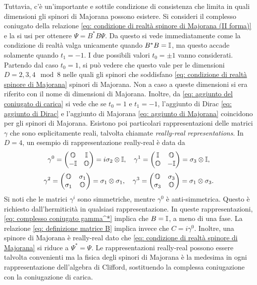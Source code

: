 Tuttavia, c'è un'importante e sottile condizione di consistenza che limita in quali dimensioni gli spinori di Majorana possono esistere. Si consideri il complesso coniugato della relazione \eqref{eq: condizione di realtà spinore di Majorana (II forma)} e la si usi per ottenere $\Psi = B^*B\Psi$. Da questo si vede immediatamente come la condizione di realtà valga unicamente quando $B^*B = \mathbb{I}$, ma questo accade solamente quando $t_1 = -1$. I due possibili valori $t_0 = \pm1$ vanno considerati. Partendo dal caso $t_0 = 1$, si può vedere che questo vale per le dimensioni $D = 2,3,4\mod{8}$ nelle quali gli spinori che soddisfano \eqref{eq: condizione di realtà spinore di Majorana} spinori di Majorana. Non a caso a queste dimensioni si era riferito con il nome di dimensioni di Majorana. Inoltre, da \eqref{eq: aggiunto del coniugato di carica} si vede che se $t_0 = 1$ e $t_1 = -1$, l'aggiunto di Dirac \eqref{eq: aggiunto di Dirac} e l'aggiunto di Majorana \eqref{eq: aggiunto di Majorana} coincidono per gli spinori di Majorana. Esistono poi particolari rappresentazioni delle matrici $\gamma$ che sono esplicitamente reali, talvolta chiamate \emph{really-real representations}. In $D = 4$, un esempio di rappresentazione really-real è data da
\begin{equation}
    \gamma^0 = 
    \begin{pmatrix}
        \mathbb{O} & \mathbb{I} \\
        -\mathbb{I} & \mathbb{O}
    \end{pmatrix} = i\sigma_2 \otimes \mathbb{I},\quad \gamma^1 = 
    \begin{pmatrix}
        \mathbb{I} & \mathbb{O} \\
        \mathbb{O} & -\mathbb{I}
    \end{pmatrix} = \sigma_3 \otimes \mathbb{I},
\end{equation}
\begin{equation}
    \gamma^2 = 
    \begin{pmatrix}
        \mathbb{O} & \sigma_1 \\
        \sigma_1 & \mathbb{O}
    \end{pmatrix} = \sigma_1 \otimes \sigma_1,\quad \gamma^3 = 
    \begin{pmatrix}
        \mathbb{O} & \sigma_3 \\
        \sigma_3 & \mathbb{O}
    \end{pmatrix} = \sigma_1 \otimes \sigma_3.
\end{equation}
Si noti che le matrici $\gamma^i$ sono simmetriche, mentre $\gamma^0$ è anti-simmetrica. Questo è richiesto dall'hermiticità in qualsiasi rappresentazione. In queste rappresentazioni, \eqref{eq: complesso coniugato gamma^*} implica che $B = \mathbb{I}$, a meno di una fase. La relazione \eqref{eq: definizione matrice B} implica invece che $C = i\gamma^0$. Inoltre, una spinore di Majorana è really-real dato che \eqref{eq: condizione di realtà spinore di Majorana} si riduce a $\Psi^* = \Psi$. Le rappresentazioni really-real possono essere talvolta convenienti ma la fisica degli spinori di Majorana è la medesima in ogni rappresentazione dell'algebra di Clifford, sostituendo la complessa coniugazione con la coniugazione di carica. 


